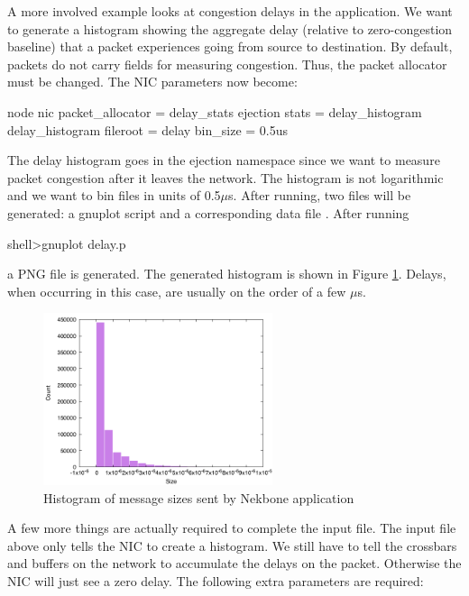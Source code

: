 A more involved example looks at congestion delays in the application.
We want to generate a histogram showing the aggregate delay (relative to zero-congestion baseline) that a packet experiences
going from source to destination.
By default, packets do not carry fields for measuring congestion. 
Thus, the packet allocator must be changed.
The NIC parameters now become:

\begin{ViFile}
node {
 nic {
  packet_allocator = delay_stats
  ejection {
   stats = delay_histogram
   delay_histogram {
    fileroot = delay
    bin_size = 0.5us
   }
  }
 }
}
\end{ViFile}
The delay histogram goes in the ejection namespace since we want to measure packet congestion after it leaves the network.
The histogram is not logarithmic and we want to bin files in units of 0.5$\mu$s.
After running, two files will be generated: a gnuplot script and a corresponding data file .
After running

\begin{ShellCmd}
shell>gnuplot delay.p 
\end{ShellCmd}
a PNG file  is generated.
The generated histogram is shown in Figure \ref{fig:nekboneDelayHistogram}. 
Delays, when occurring in this case, are usually on the order of a few $\mu$s.

\begin{figure}
\centering
\includegraphics[width=0.6\textwidth]{figures/delayHistogramNekbone}
\caption{Histogram of message sizes sent by Nekbone application}
\label{fig:nekboneDelayHistogram}
\end{figure}

A few more things are actually required to complete the input file.
The input file above only tells the NIC to create a histogram.
We still have to tell the crossbars and buffers on the network to accumulate the delays on the packet.
Otherwise the NIC will just see a zero delay.
The following extra parameters are required:

